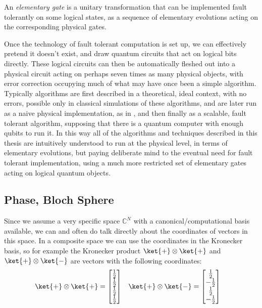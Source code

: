 An \emph{elementary gate} is a unitary transformation that can be implemented fault tolerantly on some logical states, as a sequence of elementary evolutions acting on the corresponding physical gates.

Once the technology of fault tolerant computation is set up, we can effectively pretend it doesn't exist, and draw quantum circuits that act on logical bits directly. These logical circuits can then be automatically fleshed out into a physical circuit acting on perhaps seven times as many physical objects, with error correction occupying much of what may have once been a simple algorithm. Typically algorithms are first described in a theoretical, ideal context, with no errors, possible only in classical simulations of these algorithms, and are later run as a naive physical implementation, as in \cite{algos}, and then finally as a scalable, fault tolerant algorithm, supposing that there is a quantum computer with enough qubits to run it. In this way all of the algorithms and techniques described in this thesis are intuitively understood to run at the physical level, in terms of elementary evolutions, but paying deliberate mind to the eventual need for fault tolerant implementation, using a much more restricted set of elementary gates acting on logical quantum objects.

\subsection{Phase, Bloch Sphere}
Since we assume a very specific space $\mathbb{C}^N$ with a canonical/computational basis available, we can and often do talk directly about the coordinates of vectors in this space. In a composite space we can use the coordinates in the Kronecker basis, so for example the Kronecker product $\ket{+}\otimes \ket{+}$ and $\ket{+} \otimes \ket{-}$ are vectors with the following coordinates:
\begin{align*}
\ket{+} \otimes \ket{+} = \left[\begin{matrix}
\frac{1}{2} \\
\frac{1}{2} \\
\frac{1}{2} \\
\frac{1}{2} \\
\end{matrix}\right]
&&&
\ket{+} \otimes \ket{-} = \left[\begin{matrix}
	\frac{1}{2} \\
	-\frac{1}{2} \\
	\frac{1}{2} \\
	-\frac{1}{2} \\
\end{matrix}\right]\end{align*}

